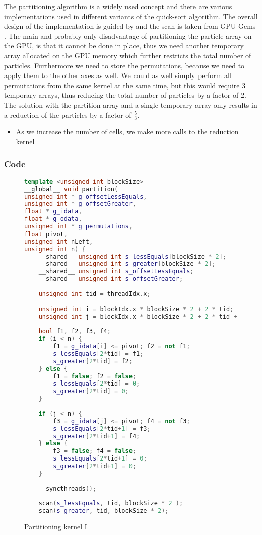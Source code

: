 \documentclass[]{article}
\begin{document}
The partitioning algorithm is a widely used concept and there are various implementations used in different variants of the quick-sort algorithm. The overall design of the implementation is guided by  and the scan is taken from GPU Gems . The main and probably only disadvantage of partitioning the particle array on the GPU, is that it cannot be done in place, thus we need another temporary array allocated on the GPU memory which further restricts the total number of particles. Furthermore we need to store the permutations, because we need to apply them to the other axes as well. We could as well simply perform all permutations from the same kernel at the same time, but this would require 3 temporary arrays, thus reducing the total number of particles by a factor of 2. The solution with the partition array and a single temporary array only results in a reduction of the particles by a factor of $\frac{5}{3}$. 	

\begin{itemize}
	\item As we increase the number of cells, we make more calls to the reduction kernel 
	
\end{itemize}

\subsubsection{Code}

\begin{figure}[H]
	
\begin{lstlisting}[language=c++]
template <unsigned int blockSize>
__global__ void partition(
unsigned int * g_offsetLessEquals,
unsigned int * g_offsetGreater,
float * g_idata,
float * g_odata,
unsigned int * g_permutations,
float pivot,
unsigned int nLeft,
unsigned int n) {
	__shared__ unsigned int s_lessEquals[blockSize * 2];
	__shared__ unsigned int s_greater[blockSize * 2];
	__shared__ unsigned int s_offsetLessEquals;
	__shared__ unsigned int s_offsetGreater;
	
	unsigned int tid = threadIdx.x;
	
	unsigned int i = blockIdx.x * blockSize * 2 + 2 * tid;
	unsigned int j = blockIdx.x * blockSize * 2 + 2 * tid + 1;
	
	bool f1, f2, f3, f4;
	if (i < n) {
		f1 = g_idata[i] <= pivot; f2 = not f1;
		s_lessEquals[2*tid] = f1;
		s_greater[2*tid] = f2;
	} else {
		f1 = false; f2 = false;
		s_lessEquals[2*tid] = 0;
		s_greater[2*tid] = 0;
	}
	
	if (j < n) {
		f3 = g_idata[j] <= pivot; f4 = not f3;
		s_lessEquals[2*tid+1] = f3;
		s_greater[2*tid+1] = f4;
	} else {
		f3 = false; f4 = false;
		s_lessEquals[2*tid+1] = 0;
		s_greater[2*tid+1] = 0;
	}
	
	__syncthreads();
	
	scan(s_lessEquals, tid, blockSize * 2 );
	scan(s_greater, tid, blockSize * 2);
	\end{lstlisting}
	\caption{Partitioning kernel I}
	\label{cuda:partitionI}
\end{figure}
\end{document}
